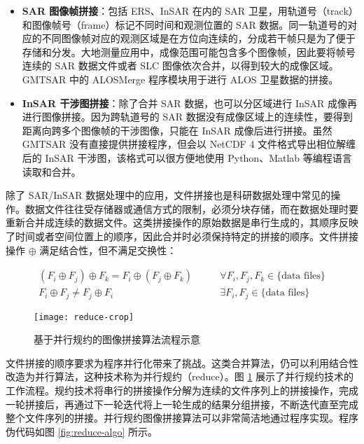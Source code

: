 \begin{itemize}
    \item \textbf{SAR 图像帧拼接}：包括 ERS、InSAR 在内的 SAR 卫星，用轨道号（track）和图像帧号（frame）标记不同时间和观测位置的 SAR 数据。同一轨道号的对应的不同图像帧对应的观测区域是在方位向连续的，分成若干帧只是为了便于存储和分发。大地测量应用中，成像范围可能包含多个图像帧，因此要将帧号连续的 SAR 数据文件或者 SLC 图像依次合并，以得到较大的成像区域。GMTSAR 中的 ALOSMerge 程序模块用于进行 ALOS 卫星数据的拼接。
    \item \textbf{InSAR 干涉图拼接}：除了合并 SAR 数据，也可以分区域进行 InSAR 成像再进行图像拼接。因为跨轨道号的 SAR 数据没有成像区域上的连续性，要得到距离向跨多个图像帧的干涉图像，只能在 InSAR 成像后进行拼接。虽然 GMTSAR 没有直接提供拼接程序，但会以 NetCDF 4 文件格式导出相位解缠后的 InSAR 干涉图，该格式可以很方便地使用 Python、Matlab 等编程语言读取和合并。
\end{itemize}

除了 SAR/InSAR 数据处理中的应用，文件拼接也是科研数据处理中常见的操作。数据文件往往受存储器或通信方式的限制，必须分块存储，而在数据处理时要重新合并成连续的数据文件。这类拼接操作的原始数据是串行生成的，其顺序反映了时间或者空间位置上的顺序，因此合并时必须保持特定的拼接的顺序。文件拼接操作 $\oplus$ 满足结合性，但不满足交换性：

\begin{equation}
\begin{split}
    (F_i \oplus F_j) \oplus F_k = F_i \oplus (F_j \oplus F_k) \qquad &\forall F_i, F_j, F_k \in \textrm{\{data files\}} \\
    F_i \oplus F_j \neq F_j \oplus F_i \qquad &\exists F_i, F_j \in \textrm{\{data files\}}
\end{split}
\end{equation}

\begin{figure}[htbp]
\centering
\texttt{[image: reduce-crop]}
\caption{基于并行规约的图像拼接算法流程示意} \label{fig:reduce}
\end{figure}

文件拼接的顺序要求为程序并行化带来了挑战。这类合并算法，仍可以利用结合性改造为并行算法，这种技术称为并行规约（reduce）。图 \ref{fig:reduce} 展示了并行规约技术的工作流程。规约技术将串行的拼接操作分解为连续的文件序列上的拼接操作，完成一轮拼接后，再通过下一轮迭代将上一轮生成的结果分组拼接，不断迭代直至完成整个文件序列的拼接。并行规约图像拼接算法可以非常简洁地通过程序实现。程序伪代码如图 \ref{fig:reduce-algo} 所示。

